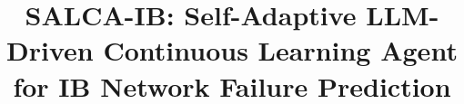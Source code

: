 \documentclass[conference]{IEEEtran}
\begin{document}
\title{SALCA-IB: Self-Adaptive LLM-Driven Continuous Learning Agent for IB Network Failure Prediction}



\maketitle
\end{document}
